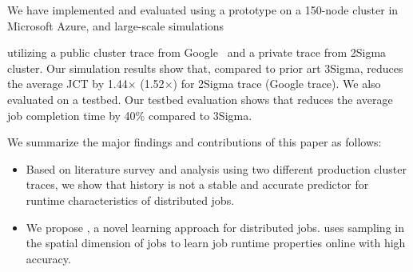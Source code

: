 We have implemented and evaluated \name using a prototype on a 150-node cluster
in Microsoft Azure, and large-scale simulations {utilizing a public cluster
trace from Google~\cite{googleTraceGithub} and a private trace from
2Sigma~\cite{2Sigma:website} cluster.  Our simulation results show that,
compared to prior art 3Sigma, \name reduces the average JCT by 1.44$\times$
(1.52$\times$) for 2Sigma trace (Google trace). We also evaluated \name on a
testbed.  Our testbed evaluation shows that \name reduces the average job
completion time by 40\% compared to 3Sigma.
\fi

%

We summarize the major findings and contributions of this paper as follows:
\begin{itemize} %
\item Based on literature survey and analysis using two different production
	cluster traces,
	we show that history is not a stable and accurate predictor for
	runtime characteristics of distributed jobs.

\item We propose \lTechnique, a novel learning approach for distributed jobs.
\lTechnique uses sampling in the spatial dimension of jobs to learn job runtime
properties online with high accuracy.


\end{itemize}}
